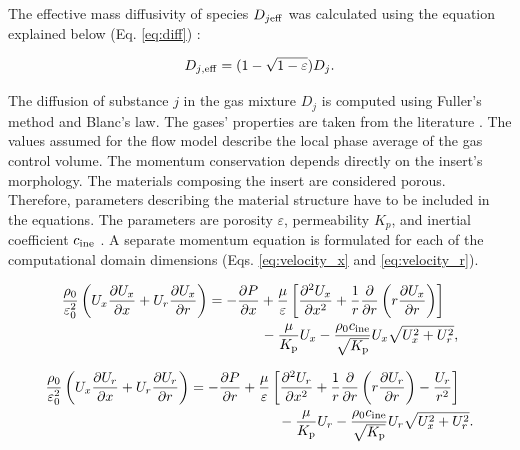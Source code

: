 \documentclass[preprint,12pt]{elsarticle}
\begin{document}
 

The effective mass diffusivity of species $D_{j\rm{eff}}$ was calculated using the equation explained below (Eq. 
\eqref{eq:diff}) \cite{Suzuki2005}:

\begin{equation}
\label{eq:diff}
 	 D_{j\rm{,eff}} = (1-\sqrt{1-\varepsilon})D_{j}.
\end{equation}

\vspace{3mm} 

The diffusion of substance $j$ in the gas mixture $D_{j}$ is computed using Fuller's method and Blanc's law. The gases' properties are taken from the literature \cite{PolingB.E.;Prausnitz2001}. The values assumed for the flow model describe the local phase average of the gas control volume.
 The momentum conservation depends directly on the insert's morphology. The materials composing the insert are considered porous. Therefore,  parameters describing the material structure have to be included in the equations. The parameters are porosity $\varepsilon$, permeability $K_p$, and inertial coefficient $c_{\rm{ine}}$ \cite{Pajak2021IJHEb}. A separate momentum equation is formulated for each of the computational domain dimensions (Eqs. \eqref{eq:velocity_x} and \eqref{eq:velocity_r}). 

\begin{eqnarray} 
\begin{multlined}
\label{eq:velocity_x}
 \frac{ \rho_0}{  \varepsilon^2_0} \left( U_x \frac {\partial U_x}{\partial x} + U_r \frac {\partial U_x}{\partial r} \right)  =  - \frac{\partial P}{\partial x} +\frac{\mu}{ \varepsilon}   \left[ \frac {\partial^2 U_x}{\partial x^2} + \frac {1}{r} \frac {\partial}{\partial r} \left( r \frac {\partial U_x}{\partial r} \right) \right]   \\
 - \frac{ \mu}{ K_{\rm{p}} } U_x - \frac{ \rho_0 c_{\rm{ine}} }{ \sqrt{ K_{\rm{p}} }} U_x \sqrt {U^2_x + U^2_r},
 \end{multlined}
 \end{eqnarray}
 
 \begin{eqnarray} 
\begin{multlined}
\label{eq:velocity_r}
 \frac{ \rho_0}{  \varepsilon^2_0} \left( U_x \frac {\partial U_r}{\partial x} + U_r \frac {\partial U_r}{\partial r} \right)  =  - \frac{\partial P}{\partial r} +\frac{\mu}{ \varepsilon}   \left[ \frac {\partial^2 U_r}{\partial x^2} + \frac {1}{r} \frac {\partial}{\partial r} \left( r \frac {\partial U_r}{\partial r} \right) - \frac {U_r}{r^2} \right]   \\
   - \frac{ \mu}{ K_{\rm{p}} } U_r - \frac{ \rho_0 c_{\rm{ine}} }{ \sqrt{ K_{\rm{p}} }} U_r \sqrt {U^2_x + U^2_r}.
   \end{multlined}
 \end{eqnarray}
 
\end{document}
